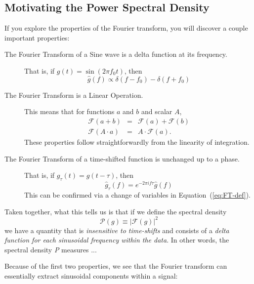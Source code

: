 \documentclass[preprint]{aastex}
\newcommand{\Eq}[1]{Equation~(\ref{eq:#1})}
\newcommand{\eq}[1]{\Eq{#1}}
\begin{document}
\subsection{Motivating the Power Spectral Density}

If you explore the properties of the Fourier transform, you will discover
a couple important properties:

\begin{description}
\item[The Fourier Transform of a Sine wave is a delta function at its frequency.]
    That is, if $g(t) = \sin(2\pi f_0 t)$, then
    \begin{equation}
        \hat{g}(f) \propto \delta(f - f_0) - \delta(f + f_0)
    \end{equation}
\item[The Fourier Transform is a Linear Operation.]
    This means that for functions $a$ and $b$ and scalar $A$,
    \begin{eqnarray}
        \mathcal{F}(a + b) &=& \mathcal{F}(a) + \mathcal{F}(b) \\
        \mathcal{F}(A \cdot a) &=& A\cdot\mathcal{F}(a).
    \end{eqnarray}
    These properties follow straightforwardly from the linearity of integration.
\item[The Fourier Transform of a time-shifted function is unchanged up to a phase.]
    That is, if $g_\tau(t) = g(t - \tau)$, then
    \begin{equation}
        \hat{g}_\tau(f) = e^{-2\pi i f \tau}\hat{g}(f)
    \end{equation}
    This can be confirmed via a change of variables in \eq{FT-def}.
\end{description}

Taken together, what this tells us is that if we define the spectral density
\begin{equation}
    \mathcal{P}(g) \equiv \left|\mathcal{F}(g)\right|^2
\end{equation}
we have a quantity that is {\it insensitive to time-shifts} and consists of a
{\it delta function for each sinusoidal frequency within the data}. In other
words, the spectral density {\it P} measures ...

Because of the first two properties, we see that the Fourier transform can essentially
extract sinusoidal components within a signal:
\end{document}
